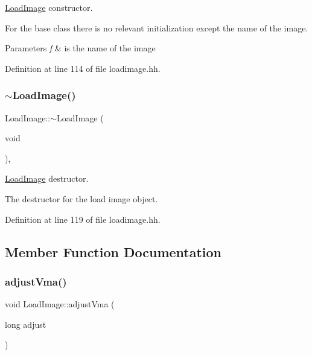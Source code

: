 \mbox{\hyperlink{class_load_image}{Load\+Image}} constructor. 

For the base class there is no relevant initialization except the name of the image. 
\begin{DoxyParams}{Parameters}
{\em f} & is the name of the image \\
\hline
\end{DoxyParams}


Definition at line 114 of file loadimage.\+hh.

\mbox{\label{class_load_image_a7818613254abfa992691eedfc33fbe28}} 
\subsubsection{\texorpdfstring{$\sim$LoadImage()}{~LoadImage()}}
{\footnotesize\ttfamily Load\+Image\+::$\sim$\+Load\+Image (\begin{DoxyParamCaption}\item[{void}]{ }\end{DoxyParamCaption})\hspace{0.3cm}{\ttfamily [inline]}, {\ttfamily [virtual]}}



\mbox{\hyperlink{class_load_image}{Load\+Image}} destructor. 

The destructor for the load image object. 

Definition at line 119 of file loadimage.\+hh.



\subsection{Member Function Documentation}
\mbox{\label{class_load_image_a51a254f705fba6f0e6524995acd5aaa7}} 
\subsubsection{\texorpdfstring{adjustVma()}{adjustVma()}}
{\footnotesize\ttfamily void Load\+Image\+::adjust\+Vma (\begin{DoxyParamCaption}\item[{long}]{adjust }\end{DoxyParamCaption})\hspace{0.3cm}{\ttfamily [pure virtual]}}



